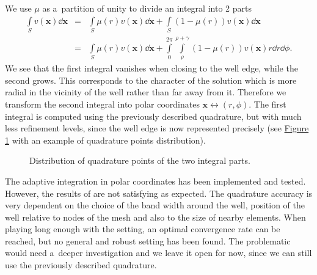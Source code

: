 \documentclass[FM,Dis]{tulthesis}
\newcommand{\fig}[1]{\hyperref[#1]{Figure \ref{#1}}}
\newcommand{\figpath}{figures/}
\begin{document}
We use $\mu$ as a~partition of unity to divide an integral into 2 parts
\begin{eqnarray} 
      \int\limits_S v(\mathbf{x}) \dd \mathbf{x} &=& \int\limits_S \mu(r) v(\mathbf{x}) \dd \mathbf{x} + \int\limits_S (1-\mu(r)) v(\mathbf{x}) \dd \mathbf{x} \nonumber\\
      &=& \int\limits_S \mu(r) v(\mathbf{x}) \dd \mathbf{x} + \int\limits_0^{2\pi} \int\limits_\rho^{\rho+\gamma} (1-\mu(r)) v(\mathbf{x}) r \dd r \dd \phi.
\end{eqnarray}
We see that the first integral vanishes when closing to the well edge, while the second grows. This corresponds
to the character of the solution which is more radial in the vicinity of the well rather than far away from it.
Therefore we transform the second integral into polar coordinates $\mathbf{x} \longleftrightarrow (r,\phi)$. 
The first integral is computed using the previously described quadrature, but with much less refinement
levels, since the well edge is now represented precisely (see \fig{fig:polar_quad_points} with
an example of quadrature points distribution).
%
\begin{figure}[!htb]
  \centering    
  \hspace{0pt}
  \caption[Polar quadrature points]
  {Distribution of quadrature points of the two integral parts.
  }
  \label{fig:polar_quad_points}
\end{figure} 

The adaptive integration in polar coordinates has been implemented and tested.
However, the results of are not satisfying as expected. The quadrature accuracy is very dependent on the choice of
the band width around the well, position of the well relative to nodes of the mesh and also to the size of nearby elements.
When playing long enough with the setting, an optimal convergence rate can be reached, but no general and robust 
setting has been found. The problematic would need a~deeper investigation and we leave it open for now, since
we can still use the previously described quadrature.
\end{document}
